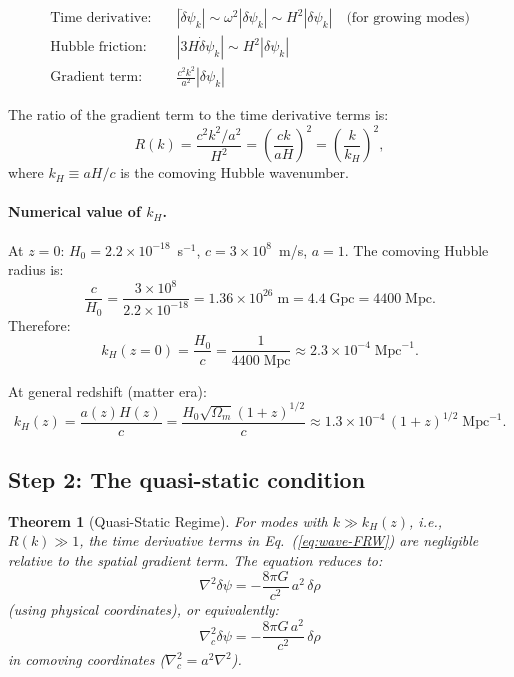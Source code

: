 \documentclass[11pt]{article}
\newtheorem{theorem}{Theorem}
\newcommand{\ee}[1]{\times 10^{#1}}
\newcommand{\dpsi}{\delta\psi}
\begin{document}
\begin{align}
\text{Time derivative:}\quad &|\ddot\dpsi_k| \sim \omega^2 |\dpsi_k|
  \sim H^2 |\dpsi_k| \quad\text{(for growing modes)} \\
\text{Hubble friction:}\quad &|3H\dot\dpsi_k| \sim H^2 |\dpsi_k| \\
\text{Gradient term:}\quad &\frac{c^2 k^2}{a^2}|\dpsi_k|
\end{align}

The ratio of the gradient term to the time derivative terms is:
\begin{equation}
R(k) = \frac{c^2 k^2/a^2}{H^2} = \left(\frac{ck}{aH}\right)^2
= \left(\frac{k}{k_H}\right)^2,
\label{eq:ratio}
\end{equation}
where $k_H \equiv aH/c$ is the comoving Hubble wavenumber.

\paragraph{Numerical value of $k_H$.}
At $z = 0$: $H_0 = 2.2\ee{-18}$~s$^{-1}$, $c = 3\ee{8}$~m/s,
$a = 1$. The comoving Hubble radius is:
\begin{equation}
\frac{c}{H_0} = \frac{3\ee{8}}{2.2\ee{-18}} = 1.36\ee{26}\;\text{m}
= 4.4\;\text{Gpc} = 4400\;\text{Mpc}.
\end{equation}
Therefore:
\begin{equation}
k_H(z=0) = \frac{H_0}{c} = \frac{1}{4400\;\text{Mpc}}
\approx 2.3\ee{-4}\;\text{Mpc}^{-1}.
\end{equation}

At general redshift (matter era):
\begin{equation}
k_H(z) = \frac{a(z)H(z)}{c} = \frac{H_0\sqrt{\Omega_m}(1+z)^{1/2}}{c}
\approx 1.3\ee{-4}\,(1+z)^{1/2}\;\text{Mpc}^{-1}.
\end{equation}

\subsection{Step 2: The quasi-static condition}

\begin{theorem}[Quasi-Static Regime]
\label{thm:QS}
For modes with $k \gg k_H(z)$, i.e., $R(k) \gg 1$, the time derivative
terms in Eq.~(\ref{eq:wave-FRW}) are negligible relative to the spatial
gradient term. The equation reduces to:
\begin{equation}
\boxed{
\nabla^2\dpsi = -\frac{8\pi G}{c^2}\,a^2\,\delta\rho
}
\label{eq:poisson-QS}
\end{equation}
(using physical coordinates), or equivalently:
\begin{equation}
\nabla^2_c\dpsi = -\frac{8\pi G\,a^2}{c^2}\,\delta\rho
\label{eq:poisson-QS-comoving}
\end{equation}
in comoving coordinates ($\nabla_c^2 = a^2\nabla^2$).
\end{theorem}
\end{document}
